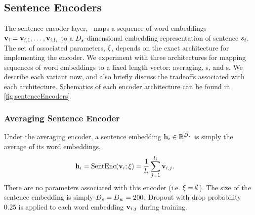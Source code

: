 %











\subsection{Sentence Encoders} \label{sec:senc}

    The sentence encoder layer, \sentEncFuncDef~maps a sequence of word 
    embeddings $\mathbf{v}_i = \mathbf{v}_{i,1},\ldots, \mathbf{v}_{i,l_i}$ 
    to a $D_{s}$-dimensional embedding representation of sentence $s_i$.
    The set of associated parameters, $\xi$, depends on the exact 
    architecture for implementing the encoder. We experiment with three 
    architectures for mapping sequences of word embeddings to a fixed length 
    vector: averaging, \recurrentneuralnetwork s, and 
    \convolutionalneuralnetwork s. We describe each variant now, and also 
    briefly discuss the tradeoffs associated with each architecture. Schematics
    of each encoder architecture can be found in 
    \autoref{fig:sentenceEncoders}.


\subsubsection{Averaging Sentence Encoder} 

    Under the averaging encoder, a sentence embedding $\mathbf{h}_i \in 
    \mathbb{R}^{D_{s}}$ is simply the average of its word embeddings,
    \begin{align} 
    \mathbf{h}_i & = \operatorname{SentEnc}(\mathbf{v}_i;\xi) =  
        \frac{1}{l_i} \sum_{j=1}^{l_i} \mathbf{v}_{i,j}.
    \end{align}
    There are no parameters associated with this encoder (i.e. 
    $\xi = \emptyset$). The size of the sentence embedding is simply
$D_{s} = D_{w} = 200$. Dropout with drop probability 0.25 is applied to each word embedding $\mathbf{v}_{i,j}$ during training.

